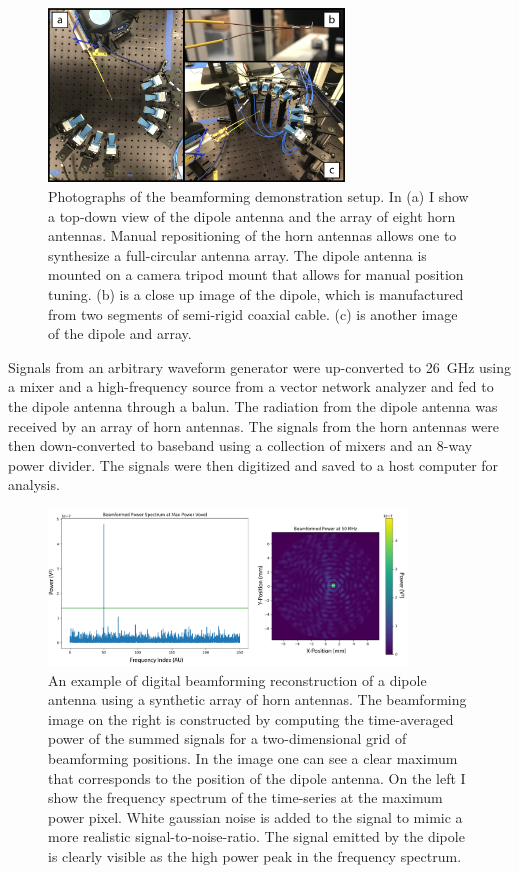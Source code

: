 \begin{figure}
    \centering
    \includegraphics*[width=0.7\textwidth]{figs/Chapter-4/230725_beamforming_demo_image.png}
    \caption{\label{fig:chap4-beamforming-demo-photos}Photographs of the beamforming demonstration setup. In (a) I show a top-down view of the dipole antenna and the array of eight horn antennas. Manual repositioning of the horn antennas allows one to synthesize a full-circular antenna array. The dipole antenna is mounted on a camera tripod mount that allows for manual position tuning. (b) is a close up image of the dipole, which is manufactured from two segments of semi-rigid coaxial cable. (c) is another image of the dipole and array.}
\end{figure}

Signals from an arbitrary waveform generator were up-converted to 26~GHz using a mixer and a high-frequency source from a vector network analyzer and fed to the dipole antenna through a balun. The radiation from the dipole antenna was received by an array of horn antennas. The signals from the horn antennas were then down-converted to baseband using a collection of mixers and an 8-way power divider. The signals were then digitized and saved to a host computer for analysis.

\begin{figure}
    \centering
    \includegraphics*[width=0.85\textwidth]{figs/Chapter-4/230725_beamforming_example.png}
    \caption{\label{fig:chap4-beamforming-demo-example}An example of digital beamforming reconstruction of a dipole antenna using a synthetic array of horn antennas. The beamforming image on the right is constructed by computing the time-averaged power of the summed signals for a two-dimensional grid of beamforming positions. In the image one can see a clear maximum that corresponds to the position of the dipole antenna. On the left I show the frequency spectrum of the time-series at the maximum power pixel. White gaussian noise is added to the signal to mimic a more realistic signal-to-noise-ratio. The signal emitted by the dipole is clearly visible as the high power peak in the frequency spectrum.}
\end{figure}

